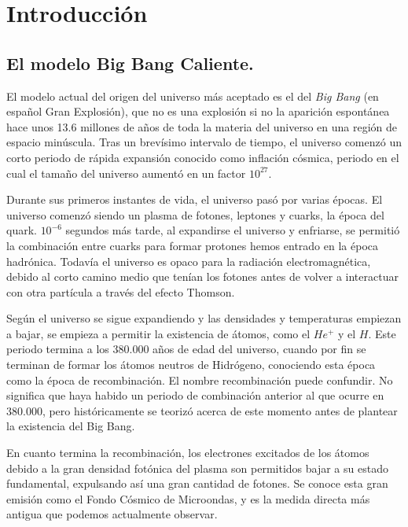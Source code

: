 \chapter{Introducción}

\section{El modelo Big Bang Caliente. }

El modelo actual del origen del universo más aceptado es el del \textit{Big Bang} (en español Gran Explosión), que no es una explosión si no la aparición espontánea hace unos 13.6 millones de años de toda la materia del universo en una región de espacio minúscula. Tras un brevísimo intervalo de tiempo, el universo comenzó un corto periodo de rápida expansión conocido como inflación cósmica, periodo en el cual el tamaño del universo aumentó en un factor $10^{27}$.

Durante sus primeros instantes de vida, el universo pasó por varias épocas. El universo comenzó siendo un plasma de fotones, leptones y cuarks, la época del quark. $10^{-6}$ segundos más tarde, al expandirse el universo y enfriarse, se permitió la combinación entre cuarks para formar protones hemos entrado en la época hadrónica. Todavía el universo es opaco para la radiación electromagnética, debido al corto camino medio que tenían los fotones antes de volver a interactuar con otra partícula a través del efecto Thomson. 

Según el universo se sigue expandiendo y las densidades y temperaturas empiezan a bajar, se empieza a permitir la existencia de átomos, como el $He^{+}$ y el $H$. Este periodo termina a los 380.000 años de edad del universo, cuando por fin se terminan de formar los átomos neutros de Hidrógeno, conociendo esta época como la época de recombinación. El nombre recombinación puede confundir. No significa que haya habido un periodo de combinación anterior al que ocurre en 380.000, pero históricamente se teorizó acerca de este momento antes de plantear la existencia del Big Bang. 

En cuanto termina la recombinación, los electrones excitados de los átomos debido a la gran densidad fotónica del plasma son permitidos bajar a su estado fundamental, expulsando así una gran cantidad de fotones. Se conoce esta gran emisión como el Fondo Cósmico de Microondas, y es la medida directa más antigua que podemos actualmente observar.

